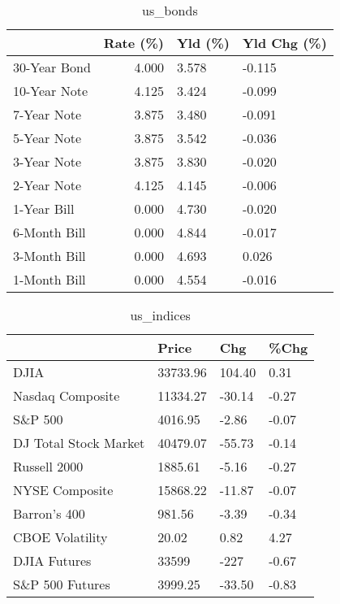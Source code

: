\documentclass{article}%
\begin{document}
%


\begin{table}[htbp]%
\caption{us\_bonds}%
\centering%
\begin{adjustbox}{width=1\textwidth}%
\begin{tabular}{lrll}
\toprule
             &  Rate (\%) & Yld (\%) & Yld Chg (\%) \\
\midrule
30-Year Bond &     4.000 &   3.578 &      -0.115 \\
10-Year Note &     4.125 &   3.424 &      -0.099 \\
 7-Year Note &     3.875 &   3.480 &      -0.091 \\
 5-Year Note &     3.875 &   3.542 &      -0.036 \\
 3-Year Note &     3.875 &   3.830 &      -0.020 \\
 2-Year Note &     4.125 &   4.145 &      -0.006 \\
 1-Year Bill &     0.000 &   4.730 &      -0.020 \\
6-Month Bill &     0.000 &   4.844 &      -0.017 \\
3-Month Bill &     0.000 &   4.693 &       0.026 \\
1-Month Bill &     0.000 &   4.554 &      -0.016 \\
\bottomrule
\end{tabular}
%
\end{adjustbox}%
\end{table}

%


\begin{table}[htbp]%
\caption{us\_indices}%
\centering%
\begin{adjustbox}{width=1\textwidth}%
\begin{tabular}{llll}
\toprule
                      &    Price &    Chg &  \%Chg \\
\midrule
                 DJIA & 33733.96 & 104.40 &  0.31 \\
     Nasdaq Composite & 11334.27 & -30.14 & -0.27 \\
              S\&P 500 &  4016.95 &  -2.86 & -0.07 \\
DJ Total Stock Market & 40479.07 & -55.73 & -0.14 \\
         Russell 2000 &  1885.61 &  -5.16 & -0.27 \\
       NYSE Composite & 15868.22 & -11.87 & -0.07 \\
         Barron's 400 &   981.56 &  -3.39 & -0.34 \\
      CBOE Volatility &    20.02 &   0.82 &  4.27 \\
         DJIA Futures &    33599 &   -227 & -0.67 \\
      S\&P 500 Futures &  3999.25 & -33.50 & -0.83 \\
\bottomrule
\end{tabular}
%
\end{adjustbox}%
\end{table}
\end{document}
